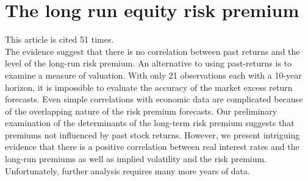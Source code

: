 \documentclass[12 pt]{article}
\begin{document}
\section{The long run equity risk premium}
This article is cited 51 times.\\
The evidence suggest that there is no correlation between past returns and the level of the long-run risk premium. An alternative to using past-returns is to examine a measure of valuation. With only 21 observations each with a 10-year horizon, it is impossible to evaluate the accuracy of the market excess return forecasts. Even simple correlations with economic data are complicated because of the overlapping nature of the risk premium forecasts. Our preliminary examination of the determinants of the long-term risk premium suggests that premiums not influenced by past stock returns. However, we present intriguing evidence that there is a positive correlation between real interest rates and the long-run premiums as well as implied volatility and the risk premium. Unfortunately, further analysis requires many more years of data.
\end{document}
